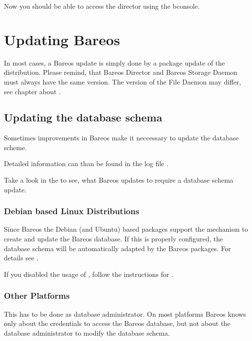 Now you should be able to access the director using the bconsole.

\chapter{Updating Bareos}
\label{bareos-update}

In most cases, a Bareos update is simply done by a package update of the distribution.
Please remind, that Bareos Director and Bareos Storage Daemon must always have the same version.
The version of the File Daemon may differ, see chapter about .

\section{Updating the database schema}

Sometimes improvements in Bareos make it neccessary to update the database scheme.


Detailed information can than be found in the log file \logfileUnix.

Take a look in the  to see, what Bareos updates to require a database schema update.


\subsection{Debian based Linux Distributions}

Since Bareos  the Debian (and Ubuntu) based packages support the  mechanism to create and update the Bareos database.
If this is properly configured, the database schema will be automatically adapted by the Bareos packages.
For details see .

If you disabled the usage of , 
follow the instructions for .

\subsection{Other Platforms}
    \label{sec:UpdateDatabaseOtherDistributions}

This has to be done as database administrator.
On most platforms Bareos knows only about the credentials to access the Bareos database,
but not about the database administrator to modify the database schema.

